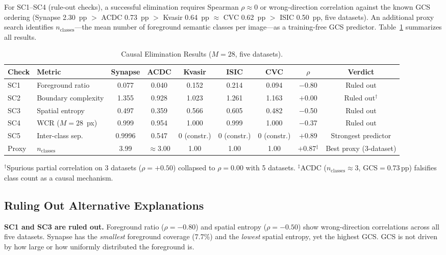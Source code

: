 For SC1--SC4 (rule-out checks), a successful elimination requires Spearman $\rho \approx 0$ or wrong-direction correlation against the known GCS ordering (Synapse 2.30~pp $>$ ACDC 0.73~pp $>$ Kvasir 0.64~pp $\approx$ CVC 0.62~pp $>$ ISIC 0.50~pp, five datasets). An additional proxy search identifies $n_\text{classes}$---the mean number of foreground semantic classes per image---as a training-free GCS predictor. Table~\ref{tab:causal} summarizes all results.

\begin{table}[tb]
  \caption{Causal Elimination Results ($M{=}28$, five datasets).}
  \label{tab:causal}
  \centering
  \setlength{\tabcolsep}{6pt}
  \begin{tabular}{llccccccc}
    \toprule
    Check & Metric & Synapse & ACDC & Kvasir & ISIC & CVC & $\rho$ & Verdict \\
    \midrule
    SC1 & Foreground ratio     & 0.077  & 0.040 & 0.152 & 0.214 & 0.094 & $-$0.80 & Ruled out \\
    SC2 & Boundary complexity  & 1.355  & 0.928 & 1.023 & 1.261 & 1.163 & $+$0.00 & Ruled out$^\dagger$ \\
    SC3 & Spatial entropy      & 0.497  & 0.359 & 0.566 & 0.605 & 0.482 & $-$0.50 & Ruled out \\
    SC4 & WCR ($M{=}28$~px)   & 0.999  & 0.954 & 1.000 & 0.999 & 1.000 & $-$0.37 & Ruled out \\
    SC5 & Inter-class sep.     & 0.9996 & 0.547 & 0 (constr.) & 0 (constr.) & 0 (constr.) & $+$0.89 & Strongest predictor \\
    \midrule
    Proxy & $n_\text{classes}$ & 3.99   & ${\approx}3.00$ & 1.00  & 1.00  & 1.00  & $+$0.87$^\ddagger$ & Best proxy (3-dataset) \\
    \bottomrule
  \end{tabular}
  \par\vspace{5pt}
  \parbox{\textwidth}{\footnotesize $^\dagger$Spurious partial correlation on 3 datasets ($\rho{=}+0.50$) collapsed to $\rho{=}0.00$ with 5 datasets.
  $^\ddagger$ACDC ($n_\text{classes}{\approx}3$, GCS${=}0.73$\,pp) falsifies class count as a causal mechanism.}
\end{table}

\subsection{Ruling Out Alternative Explanations}

\textbf{SC1 and SC3 are ruled out.} Foreground ratio ($\rho{=}-0.80$) and spatial entropy ($\rho{=}-0.50$) show wrong-direction correlations across all five datasets. Synapse has the \emph{smallest} foreground coverage (7.7\%) and the \emph{lowest} spatial entropy, yet the highest GCS. GCS is not driven by how large or how uniformly distributed the foreground is.

